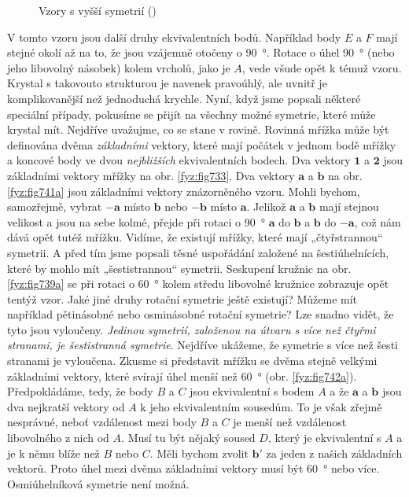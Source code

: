     \begin{figure}[ht!]    %
      \centering
                     \newline
      \caption{Vzory s vyšší symetrií (\cite[s.~549]{Feynman02})}
      \label{fyz:fig741}
    \end{figure}

    V tomto vzoru jsou další druhy ekvivalentních bodů. Například body \(E\) a \(F\) mají stejné 
    okolí až na to, že jsou vzájemně otočeny o \SI{90}{\degree}. Rotace o úhel \SI{90}{\degree} 
    (nebo jeho libovolný násobek) kolem vrcholů, jako je \(A\), vede všude opět k témuž vzoru. 
    Krystal s takovouto strukturou je navenek pravoúhlý, ale uvnitř je komplikovanější než 
    jednoduchá krychle. Nyní, když jsme popsali některé speciální případy, pokusíme se přijít na 
    všechny možné symetrie, které může krystal mít. Nejdříve uvažujme, co se stane v rovině. 
    Rovinná mřížka může být definována dvěma \emph{základními} vektory, které mají počátek v jednom 
    bodě mřížky a koncové body ve dvou \emph{nejbližších} ekvivalentních bodech. Dva vektory 
    \(\bm{1}\) a \(\bm{2}\) jsou základními vektory mřížky na obr. \ref{fyz:fig733}. Dva vektory 
    \(\bm{a}\) a \(\bm{b}\) na obr. \ref{fyz:fig741a} jsou základními vektory znázorněného vzoru. 
    Mohli bychom, samozřejmě, vybrat \(\bm{-a}\) místo \(\bm{b}\) nebo \(\bm{-b}\) místo 
    \(\bm{a}\). Jelikož \(\bm{a}\) a \(\bm{b}\) mají stejnou velikost a jsou na sebe kolmé, přejde 
    při rotaci o \SI{90}{\degree} \(\bm{a}\) do \(\bm{b}\) a \(\bm{b}\) do \(\bm{-a}\), což nám 
    dává opět tutéž mřížku. Vidíme, že existují mřížky, které mají „čtyřstrannou“ symetrii. A před 
    tím jsme popsali těsné uspořádání založené na šestiúhelnících, které by mohlo mít 
    „šestistrannou“ symetrii. Seskupení kružnic na obr. \ref{fyz:fig739a} se při rotaci o 
    \SI{60}{\degree} kolem středu libovolné kružnice zobrazuje opět tentýž vzor. Jaké jiné druhy 
    rotační symetrie ještě existují? Můžeme mít například pětinásobné nebo osminásobné rotační 
    symetrie? Lze snadno vidět, že tyto jsou vyloučeny.\emph{ Jedinou symetrií, založenou na útvaru 
    s více než čtyřmi stranami, je šestistranná symetrie}. Nejdříve ukážeme, že symetrie s více než 
    šesti stranami je vyloučena. Zkusme si představit mřížku se dvěma stejně velkými základními 
    vektory, které svírají úhel menší než \SI{60}{\degree} (obr. \ref{fyz:fig742a}). Předpokládáme, 
    tedy, že body \(B\) a \(C\) jsou ekvivalentní s bodem \(A\) a že \(\bm{a}\) a \(\bm{b}\) jsou 
    dva nejkratší vektory od \(A\) k jeho ekvivalentním sousedům. To je však zřejmě nesprávné, 
    neboť vzdálenost mezi body \(B\) a \(C\) je menší než vzdálenost libovolného z nich od \(A\). 
    Musí tu být nějaký soused \(D\), který je ekvivalentní s \(A\) a je k němu blíže než \(B\) nebo 
    \(C\). Měli bychom zvolit \(\bm{b'}\) za jeden z našich základních vektorů. Proto úhel mezi 
    dvěma základními vektory musí být \SI{60}{\degree} nebo více. Osmiúhelníková symetrie není 
    možná.

